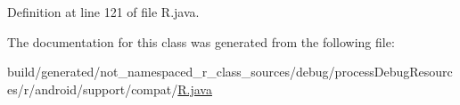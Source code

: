 Definition at line 121 of file R.\+java.



The documentation for this class was generated from the following file\+:\begin{DoxyCompactItemize}
\item 
build/generated/not\+\_\+namespaced\+\_\+r\+\_\+class\+\_\+sources/debug/process\+Debug\+Resources/r/android/support/compat/\mbox{\hyperlink{android_2support_2compat_2_r_8java}{R.\+java}}\end{DoxyCompactItemize}
